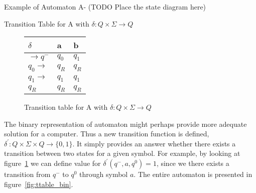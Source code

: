 \documentclass[runningheads,a4paper]{llncs}
\begin{document}
Example of Automaton A- {\color{red}(TODO Place the state diagram here)}

Transition Table for A with $\delta: Q \times \Sigma \rightarrow Q$ 

\begin{figure}
\begin{center}

	\setlength{\tabcolsep}{4pt}
	\renewcommand{\arraystretch}{1.5}
	
	\begin{tabular}{|P{1.0cm} || P{0.6cm} | P{0.6cm} |}
	\hline
	$\delta$ & a & b \\
	\hline
	\hline
	$\rightarrow q^-$ 		& $q_0$ & $q_1$ \\
	\hline
	$q_0 \rightarrow$ 		& $q_R$ & $q_R$ \\
	\hline
	$q_1 \rightarrow$ 		& $q_1$ & $q_1$ \\
	\hline
	$q_R$  					& $q_R$ & $q_R$ \\
	\hline
	\end{tabular}

	
\caption{Transition table for A with $\delta: Q \times \Sigma \rightarrow Q$}
\label{fig:ttable_std}
\end{center}
\end{figure}


The binary representation of automaton might perhaps provide more adequate solution for a computer. Thus a new transition function is defined, $\delta^{'}: Q \times \Sigma \times Q \rightarrow \{0,1\}$. It simply provides an answer whether there exists a transition between two states for a given symbol. For example, by looking at figure~\ref{fig:ttable_std} we can define value for $\delta^{'}(q^-,a,q^0) = 1$, since we there exists a transition from $q^-$ to $q^0$ through symbol $a$. The entire automaton is presented in figure~\ref{fig:ttable_bin}.
\end{document}
